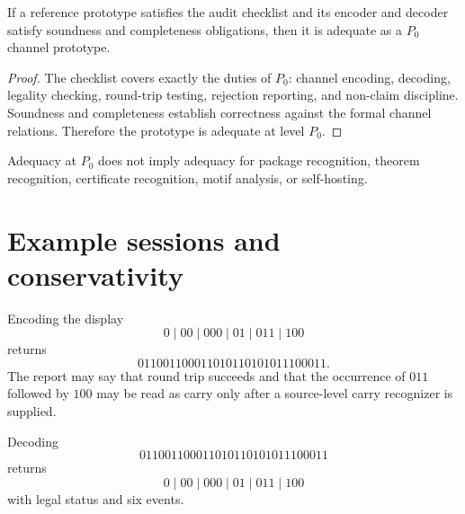 \begin{theorem}
\label{thm:minimal-prototype-audit-suffices}
If a reference prototype satisfies the audit checklist and its encoder and decoder satisfy soundness and completeness obligations, then it is adequate as a $P_0$ channel prototype.
\end{theorem}

\begin{proof}
The checklist covers exactly the duties of $P_0$: channel encoding, decoding, legality checking, round-trip testing, rejection reporting, and non-claim discipline. Soundness and completeness establish correctness against the formal channel relations. Therefore the prototype is adequate at level $P_0$.
\end{proof}

\begin{corollary}
\label{cor:minimal-prototype-p0-not-higher}
Adequacy at $P_0$ does not imply adequacy for package recognition, theorem recognition, certificate recognition, motif analysis, or self-hosting.
\end{corollary}

\section{Example sessions and conservativity}
\label{sec:minimal-prototype-examples-conservativity}

\begin{example}
\label{ex:minimal-prototype-session-encode-completion}
Encoding the display
$$
  0\mid 00\mid 000\mid 01\mid 011\mid 100
$$
returns
$$
  011001100011010110101011100011.
$$
The report may say that round trip succeeds and that the occurrence of $011$ followed by $100$ may be read as carry only after a source-level carry recognizer is supplied.
\end{example}

\begin{example}
\label{ex:minimal-prototype-session-decode-completion}
Decoding
$$
  011001100011010110101011100011
$$
returns
$$
  0\mid 00\mid 000\mid 01\mid 011\mid 100
$$
with legal status and six events.
\end{example}

